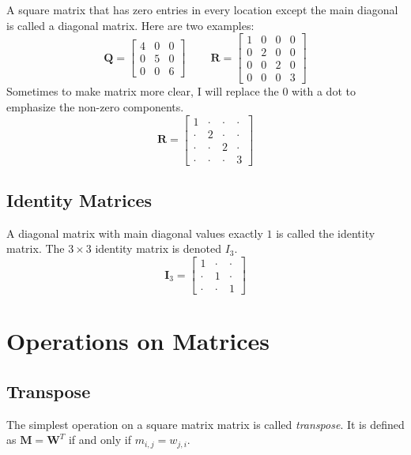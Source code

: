 \documentclass[]{book}
\theoremstyle{definition}
\theoremstyle{definition}
\theoremstyle{remark}
\begin{document}
A square matrix that has zero entries in every location except the main
diagonal is called a diagonal matrix. Here are two examples: \[
\boldsymbol{Q}=\left[\begin{array}{ccc}
4 & 0 & 0\\
0 & 5 & 0\\
0 & 0 & 6
\end{array}\right]\;\;\;\;\;\;\;\;\boldsymbol{R}=\left[\begin{array}{cccc}
1 & 0 & 0 & 0\\
0 & 2 & 0 & 0\\
0 & 0 & 2 & 0\\
0 & 0 & 0 & 3
\end{array}\right]
\] Sometimes to make matrix more clear, I will replace the \(0\) with a
dot to emphasize the non-zero components. \[
\boldsymbol{R}=\left[\begin{array}{cccc}
1 & \cdot & \cdot & \cdot\\
\cdot & 2 & \cdot & \cdot\\
\cdot & \cdot & 2 & \cdot\\
\cdot & \cdot & \cdot & 3
\end{array}\right]
\]

\subsection{Identity Matrices}\label{identity-matrices}

A diagonal matrix with main diagonal values exactly \(1\) is called the
identity matrix. The \(3\times3\) identity matrix is denoted \(I_{3}\).
\[
\boldsymbol{I}_{3}=\left[\begin{array}{ccc}
1 & \cdot & \cdot\\
\cdot & 1 & \cdot\\
\cdot & \cdot & 1
\end{array}\right]
\]

\section{Operations on Matrices}\label{operations-on-matrices}

\subsection{Transpose}\label{transpose}

The simplest operation on a square matrix matrix is called
\emph{transpose}. It is defined as \(\boldsymbol{M}=\boldsymbol{W}^{T}\)
if and only if \(m_{i,j}=w_{j,i}.\)
\end{document}
